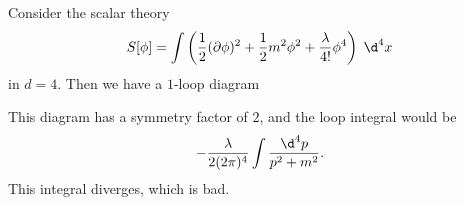 \documentclass[a4paper]{article}
\begin{document}
Consider the scalar theory
\[
  S[\phi] = \int \left(\frac{1}{2}(\partial \phi)^2 + \frac{1}{2} m^2 \phi^2 + \frac{\lambda}{4!} \phi^4\right)\;\d^4 x
\]
in $d = 4$. Then we have a $1$-loop diagram
\begin{center}
\end{center}
This diagram has a symmetry factor of $2$, and the loop integral would be
\[
  -\frac{\lambda}{2(2\pi)^4} \int \frac{\d^4 p}{p^2 + m^2}.
\]
This integral diverges, which is bad.
\end{document}
